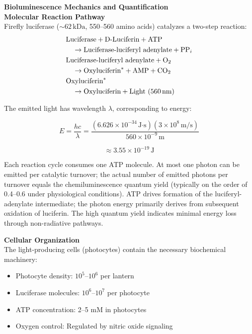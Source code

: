 \begin{technical}
{\Large\textbf{Bioluminescence Mechanics and Quantification}}\\[0.2em]

\noindent\textbf{Molecular Reaction Pathway}\\
Firefly luciferase ($\sim 62\,\text{kDa}$, 550–560 amino acids) catalyzes a two-step reaction:
\begin{align*}
&\text{Luciferase} + \text{D-Luciferin} + \text{ATP} \notag\\
&\quad\rightarrow \text{Luciferase-luciferyl adenylate} + \text{PP}_i \notag\\
&\text{Luciferase-luciferyl adenylate} + \text{O}_2 \notag\\
&\quad\rightarrow \text{Oxyluciferin}^* + \text{AMP} + \text{CO}_2 \notag\\
&\text{Oxyluciferin}^* \notag\\
&\quad\rightarrow \text{Oxyluciferin} + \text{Light (560\,nm)}
\end{align*}

The emitted light has wavelength $\lambda$, corresponding to energy:

\begin{equation}
E = \frac{hc}{\lambda} = 
\frac{(6.626 \times 10^{-34}\,\text{J·s}) (3 \times 10^8\,\text{m/s})}
{560 \times 10^{-9}\,\text{m}} 
\end{equation}

\begin{equation}
\approx 3.55 \times 10^{-19}\,\text{J}
\end{equation}

Each reaction cycle consumes one ATP molecule. At most one photon can be emitted per catalytic turnover; the actual number of emitted photons per turnover equals the chemiluminescence quantum yield (typically on the order of 0.4–0.6 under physiological conditions). ATP drives formation of the luciferyl-adenylate intermediate; the photon energy primarily derives from subsequent oxidation of luciferin. The high quantum yield indicates minimal energy loss through non-radiative pathways.

\noindent\textbf{Cellular Organization}\\
The light-producing cells (photocytes) contain the necessary biochemical machinery:

\begin{itemize}[leftmargin=*,topsep=0pt,itemsep=0pt]
    \item Photocyte density: $10^5$–$10^6$ per lantern
    \item Luciferase molecules: $10^6$–$10^7$ per photocyte
    \item ATP concentration: 2–5 mM in photocytes
    \item Oxygen control: Regulated by nitric oxide signaling
\end{itemize}


\end{technical}
